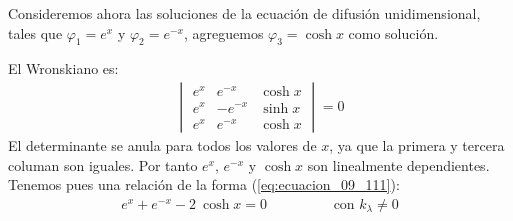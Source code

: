 Consideremos ahora las soluciones de la ecuación de difusión unidimensional, tales que $\varphi_{1} = e^{x}$ y $\varphi_{2} = e^{-x}$, agreguemos $\varphi_{3} = \cosh x$ como solución. 

El Wronskiano es:
\begin{align*}
\begin{vmatrix}
e^{x}  & e^{-x} & \cosh x \\
e^{x}  & -e^{-x} & \sinh x \\
e^{x}  & e^{-x} & \cosh x
\end{vmatrix} = 0
\end{align*}
El determinante se anula para todos los valores de $x$, ya que la primera y tercera columan son iguales. Por tanto $e^{x}$, $e^{-x}$ y $\cosh	x$ son linealmente dependientes. Tenemos pues una relación de la forma (\ref{eq:ecuacion_09_111}):
\begin{align*}
e^{x} + e^{-x} - 2 \: \cosh x = 0 \hspace{2cm} \text{con } k_{\lambda} \neq 0
\end{align*}
